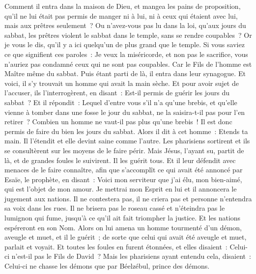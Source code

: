 \begin{multicols}{2}
Comment il entra dans la maison de Dieu, et mangea les pains de proposition, qu'il ne lui était pas permis de manger ni à lui, ni à ceux qui étaient avec lui, mais aux prêtres seulement~?
Ou n'avez-vous pas lu dans la loi, qu'aux jours du sabbat, les prêtres violent le sabbat dans le temple, sans se rendre coupables~?
Or je vous le dis, qu'il y a ici quelqu'un de plus grand que le temple.
Si vous saviez ce que signifient ces paroles~: Je veux la miséricorde, et non pas le sacrifice, vous n'auriez pas condamné ceux qui ne sont pas coupables.
Car le Fils de l'homme est Maître même du sabbat.
Puis étant parti de là, il entra dans leur synagogue.
Et voici, il s'y trouvait un homme qui avait la main sèche. Et pour avoir sujet de l'accuser, ils l'interrogèrent, en disant~: Est-il permis de guérir les jours du sabbat~?
Et il répondit~: Lequel d'entre vous s'il n'a qu'une brebis, et qu'elle vienne à tomber dans une fosse le jour du sabbat, ne la saisira-t-il pas pour l'en retirer~?
Combien un homme ne vaut-il pas plus qu'une brebis~! Il est donc permis de faire du bien les jours du sabbat.
Alors il dit à cet homme~: Etends ta main. Il l'étendit et elle devint saine comme l'autre.
Les pharisiens sortirent et ils se consultèrent sur les moyens de le faire périr.
Mais Jésus, l'ayant su, partit de là, et de grandes foules le suivirent. Il les guérit tous.
Et il leur défendit avec menaces de le faire connaître,
afin que s'accomplît ce qui avait été annoncé par Esaïe, le prophète, en disant~:
Voici mon serviteur que j'ai élu, mon bien-aimé, qui est l'objet de mon amour. Je mettrai mon Esprit en lui et il annoncera le jugement aux nations.
Il ne contestera pas, il ne criera pas et personne n'entendra sa voix dans les rues.
Il ne brisera pas le roseau cassé et n'éteindra pas le lumignon qui fume, jusqu'à ce qu'il ait fait triompher la justice.
Et les nations espéreront en son Nom.
Alors on lui amena un homme tourmenté d'un démon, aveugle et muet, et il le guérit~; de sorte que celui qui avait été aveugle et muet, parlait et voyait.
Et toutes les foules en furent étonnées, et elles disaient~: Celui-ci n'est-il pas le Fils de David~?
Mais les pharisiens ayant entendu cela, disaient~: Celui-ci ne chasse les démons que par Béelzébul, prince des démons.

\end{multicols}
